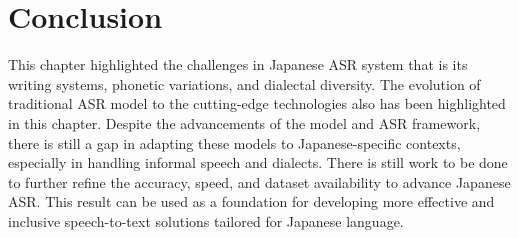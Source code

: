 \section{Conclusion}
This chapter highlighted the challenges in Japanese ASR system that is its writing systems, phonetic variations, and dialectal diversity. The evolution of traditional ASR model to the cutting-edge technologies also has been highlighted in this chapter. Despite the advancements of the model and ASR framework, there is still a gap in adapting these models to Japanese-specific contexts, especially in handling informal speech and dialects. There is still work to be done to further refine the accuracy, speed, and dataset availability to advance Japanese ASR. This result can be used as a foundation for developing more effective and inclusive speech-to-text solutions tailored for Japanese language.